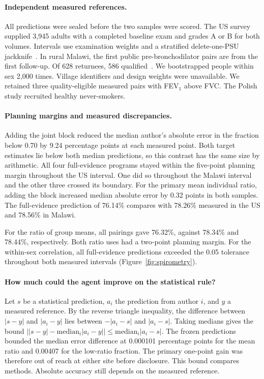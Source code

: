 \paragraph{Independent measured references.}
All predictions were sealed before the two samples were scored. The US survey supplied 3,945 adults with a completed baseline exam and grades A or B for both volumes. Intervals use examination weights and a stratified delete-one-PSU jackknife~\cite{cdcspiro}. In rural Malawi, the first public pre-bronchodilator pairs are from the first follow-up. Of 628 returnees, 586 qualified~\cite{malawispi}. We bootstrapped people within sex 2,000 times. Village identifiers and design weights were unavailable. We retained three quality-eligible measured pairs with FEV$_1$ above FVC. The Polish study recruited healthy never-smokers.

\paragraph{Planning margins and measured discrepancies.}
Adding the joint block reduced the median author's absolute error in the fraction below 0.70 by 9.24 percentage points at each measured point. Both target estimates lie below both median predictions, so this contrast has the same size by arithmetic. All four full-evidence programs stayed within the five-point planning margin throughout the US interval. One did so throughout the Malawi interval and the other three crossed its boundary. For the primary mean individual ratio, adding the block increased median absolute error by 0.32 points in both samples. The full-evidence prediction of 76.14\% compares with 78.26\% measured in the US and 78.56\% in Malawi.

\newpage
For the ratio of group means, all pairings gave 76.32\%, against 78.34\% and 78.44\%, respectively. Both ratio uses had a two-point planning margin. For the within-sex correlation, all full-evidence predictions exceeded the 0.05 tolerance throughout both measured intervals (Figure~\ref{fig:spirometry}).

\paragraph{How much could the agent improve on the statistical rule?}
Let $s$ be a statistical prediction, $a_i$ the prediction from author $i$, and $y$ a measured reference. By the reverse triangle inequality, the difference between $|s-y|$ and $|a_i-y|$ lies between $-|a_i-s|$ and $|a_i-s|$. Taking medians gives the bound $\bigl||s-y|-\mathrm{median}_i|a_i-y|\bigr|\leq\mathrm{median}_i|a_i-s|$. The frozen predictions bounded the median error difference at 0.000101 percentage points for the mean ratio and 0.00407 for the low-ratio fraction. The primary one-point gain was therefore out of reach at either site before disclosure. This bound compares methods. Absolute accuracy still depends on the measured reference.

